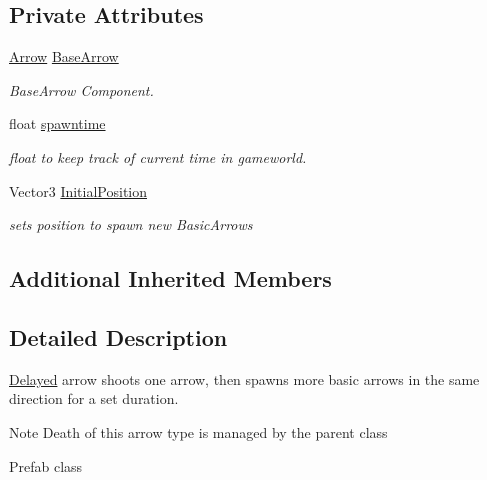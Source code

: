 \subsection*{Private Attributes}
\begin{DoxyCompactItemize}
\item 
\mbox{\label{class_delayed_a0acfe588c36cd67c143d8c293f32ff7e}} 
\hyperlink{class_arrow}{Arrow} \hyperlink{class_delayed_a0acfe588c36cd67c143d8c293f32ff7e}{Base\+Arrow}
\begin{DoxyCompactList}\small\item\em Base\+Arrow Component. \end{DoxyCompactList}\item 
\mbox{\label{class_delayed_a53603baf85cfda409690e85740cff1d6}} 
float \hyperlink{class_delayed_a53603baf85cfda409690e85740cff1d6}{spawntime}
\begin{DoxyCompactList}\small\item\em float to keep track of current time in gameworld. \end{DoxyCompactList}\item 
\mbox{\label{class_delayed_a7e66f6655bed06e61335d2de08327c66}} 
Vector3 \hyperlink{class_delayed_a7e66f6655bed06e61335d2de08327c66}{Initial\+Position}
\begin{DoxyCompactList}\small\item\em sets position to spawn new Basic\+Arrows \end{DoxyCompactList}\end{DoxyCompactItemize}
\subsection*{Additional Inherited Members}


\subsection{Detailed Description}
\hyperlink{class_delayed}{Delayed} arrow shoots one arrow, then spawns more basic arrows in the same direction for a set duration. \begin{DoxyNote}{Note}
Death of this arrow type is managed by the parent class 

Prefab class 
\end{DoxyNote}


